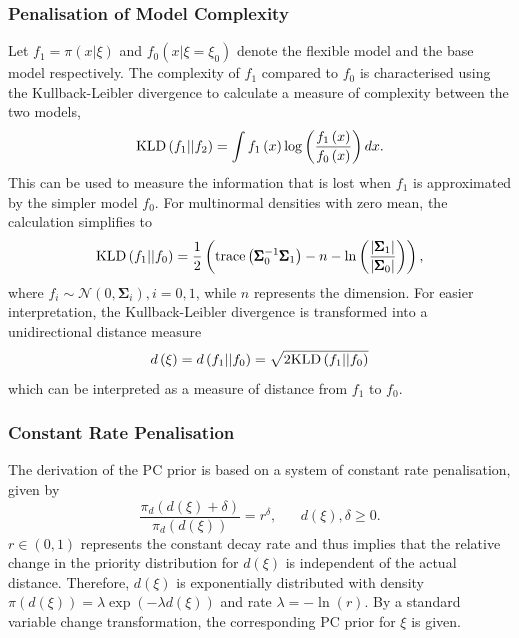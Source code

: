 \subsubsection*{Penalisation of Model Complexity} 
Let $f_1=\pi\left(x|\xi\right)$ and $f_0\left(x|\xi=\xi_0\right)$ denote the flexible model and the base model respectively. The complexity of $f_1$ compared to $f_0$ is characterised using the Kullback-Leibler divergence to calculate a measure of complexity between the two models,
\begin{equation}
    \hbox{KLD}\left(f_1||f_2\right) = \int f_1\left(x\right)\log\left(\frac{f_1\left(x\right)}{f_0\left(x\right)}\right)dx.
\end{equation}
This can be used to measure the information that is lost when $f_1$ is approximated by the simpler model $f_0$. For multinormal densities with zero mean, the calculation simplifies to
\begin{equation}
    \hbox{KLD}\left(f_1||f_0\right) = \frac{1}{2}\left(\hbox{trace}\left(\pmb{\Sigma}_0^{-1}\pmb{\Sigma}_1\right)-n-\ln\left(\frac{\left|\pmb{\Sigma}_1\right|}{\left|\pmb{\Sigma}_0\right|}\right)\right),
\end{equation}
where $f_i\sim\mathcal{N}\left(0,\pmb{\Sigma}_i\right), i=0,1$, while $n$ represents the dimension. For easier interpretation, the Kullback-Leibler divergence is transformed into a unidirectional distance measure
\begin{equation}
    d\left(\xi\right) = d\left(f_1||f_0\right)=\sqrt{2\hbox{KLD}\left(f_1||f_0\right)}
\end{equation}
which can be interpreted as a measure of distance from $f_1$ to $f_0$.
\subsubsection*{Constant Rate Penalisation}
The derivation of the PC prior is based on a system of constant rate penalisation, given by
\begin{equation}
    \frac{\pi_d\left(d\left(\xi\right)+\delta\right)}{\pi_d\left(d\left(\xi\right)\right)}=r^{\delta}, \hspace{20pt} d\left(\xi\right),\delta\geq0.
\end{equation}
$r\in\left(0,1\right)$ represents the constant decay rate and thus implies that the relative change in the priority distribution for $d\left(\xi\right)$ is independent of the actual distance. Therefore, $d\left(\xi\right)$ is exponentially distributed with density $\pi\left(d\left(\xi\right)\right)=\lambda\exp\left(-\lambda d\left(\xi\right)\right)$ and rate $\lambda = -\ln\left(r\right)$. By a standard variable change transformation, the corresponding PC prior for $\xi$ is given.
